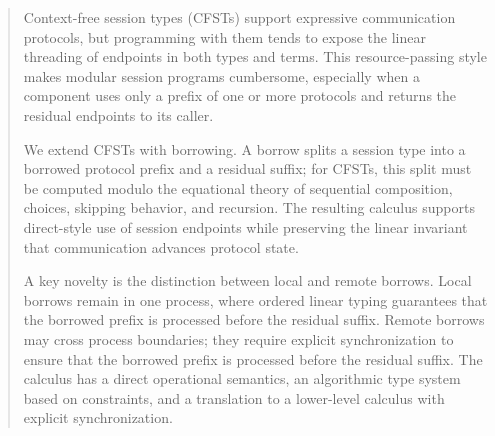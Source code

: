 \begin{abstract}
Context-free session types (CFSTs) support expressive communication
protocols, but programming with them tends to expose the linear
threading of endpoints in both types and terms. This resource-passing
style makes modular session programs cumbersome, especially when a
component uses only a prefix of one or more protocols and returns the
residual endpoints to its caller.

We extend CFSTs with borrowing. A borrow splits a session type into a
borrowed protocol prefix and a residual suffix; for CFSTs, this split
must be computed modulo the equational theory of sequential
composition, choices, skipping behavior, and recursion. The resulting
calculus supports direct-style use of session endpoints while
preserving the linear invariant that communication advances protocol
state.

A key novelty is the distinction between local and remote
borrows. Local borrows remain in one process, where ordered linear typing
guarantees that the borrowed prefix is processed before the residual
suffix. Remote borrows may cross process boundaries; they require explicit
synchronization to ensure that the borrowed prefix is processed before
the residual suffix. The calculus has a direct operational
semantics, an algorithmic type system based on
constraints, and a translation to a lower-level calculus with explicit
synchronization.
\end{abstract}
\maketitle
















